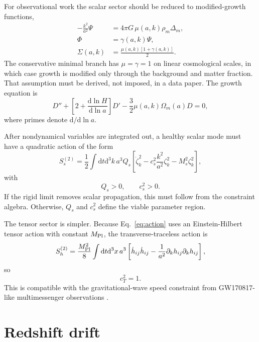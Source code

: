 \documentclass[aps,prd,reprint,nofootinbib,superscriptaddress,longbibliography]{revtex4-2}
\newcommand{\dd}{\mathrm{d}}
\newcommand{\mpl}{M_{\rm Pl}}
\begin{document}
For observational work the scalar sector should be reduced to modified-growth functions,
\begin{align}
  -\frac{k^2}{a^2}\Psi &=4\pi G\,\mu(a,k)\rho_m\Delta_m,\label{eq:mu}\\
  \Phi&=\gamma(a,k)\Psi,\label{eq:gamma}\\
  \Sigma(a,k)&=\frac{\mu(a,k)[1+\gamma(a,k)]}{2} .\label{eq:sigma}
\end{align}
The conservative minimal branch has $\mu=\gamma=1$ on linear cosmological scales, in which case growth is modified only through the background and matter fraction.  That assumption must be derived, not imposed, in a data paper.  The growth equation is
\begin{equation}
  D''+\left[2+\frac{\dd\ln H}{\dd\ln a}\right]D'
  -\frac{3}{2}\mu(a,k)\Omega_m(a)D=0,
  \label{eq:growth}
\end{equation}
where primes denote $\dd/\dd\ln a$.

After nondynamical variables are integrated out, a healthy scalar mode must have a quadratic action of the form
\begin{equation}
  S^{(2)}_s=\frac{1}{2}\int\dd t\dd^3k\,a^3Q_s
  \left[\dot\zeta_k^2-c_s^2\frac{k^2}{a^2}\zeta_k^2-M_s^2\zeta_k^2\right],
\end{equation}
with
\begin{equation}
  Q_s>0,
  \qquad
  c_s^2>0 .
\end{equation}
If the rigid limit removes scalar propagation, this must follow from the constraint algebra.  Otherwise, $Q_s$ and $c_s^2$ define the viable parameter region.

The tensor sector is simpler.  Because Eq.~\eqref{eq:action} uses an Einstein-Hilbert tensor action with constant $\mpl$, the transverse-traceless action is
\begin{equation}
  S_h^{(2)}=\frac{\mpl^2}{8}\int\dd t\dd^3x\,a^3
  \left[\dot h_{ij}\dot h_{ij}-\frac{1}{a^2}\partial_kh_{ij}\partial_kh_{ij}\right],
\end{equation}
so
\begin{equation}
  c_T^2=1 .
\end{equation}
This is compatible with the gravitational-wave speed constraint from GW170817-like multimessenger observations \cite{Abbott2017,Baker2017,Creminelli2017,Ezquiaga2017}.

\section{Redshift drift}
\end{document}
